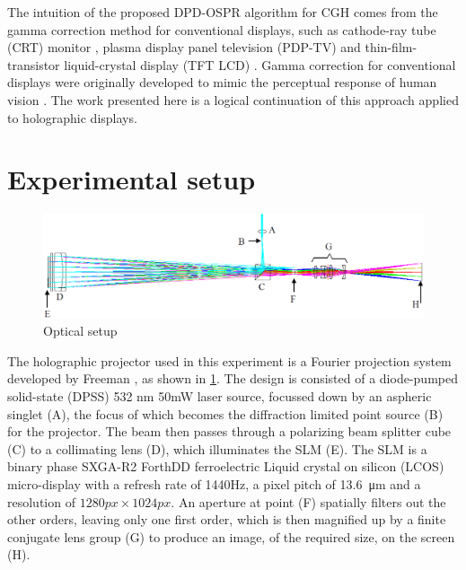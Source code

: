 The intuition of the proposed DPD-OSPR algorithm for CGH comes from the gamma correction method for conventional displays, such as cathode-ray tube (CRT) monitor \cite{Xu2009}, plasma display panel television (PDP-TV) \cite{Sung2009} and thin-film-transistor liquid-crystal display (TFT LCD) \cite{Lee2005,Prraga2014}. Gamma correction for conventional displays were originally developed to mimic the perceptual response of human vision \cite{Poynton2012}. The work presented here is a logical continuation of this approach applied to holographic displays.




\section{Experimental setup}

\begin{figure}[H]
    \centering
    \includegraphics[width=\textwidth]{projection_setup.png}
    \caption{Optical setup \cite{Freeman2009}}
    \label{fig:projection_setup}
\end{figure}

The holographic projector used in this experiment is a Fourier projection system developed by Freeman \cite{Freeman2009}, as shown in \cref{fig:projection_setup}. The design is consisted of a diode-pumped solid-state (DPSS) 532 nm 50mW laser source, focussed down by an aspheric singlet (A), the focus of which becomes the diffraction limited point source (B) for the projector. The beam then passes through a polarizing beam splitter cube (C) to a collimating lens (D), which illuminates the SLM (E). The SLM is a binary phase SXGA-R2 ForthDD ferroelectric Liquid crystal on silicon (LCOS) micro-display with a refresh rate of 1440Hz, a pixel pitch of \SI{13.6}{\micro\metre} and a resolution of $1280px \times 1024px$. An aperture at point (F) spatially filters out the other orders, leaving only one first order, which is then magnified up by a finite conjugate lens group (G) to produce an image, of the required size, on the screen (H). \cite{Freeman2009}

